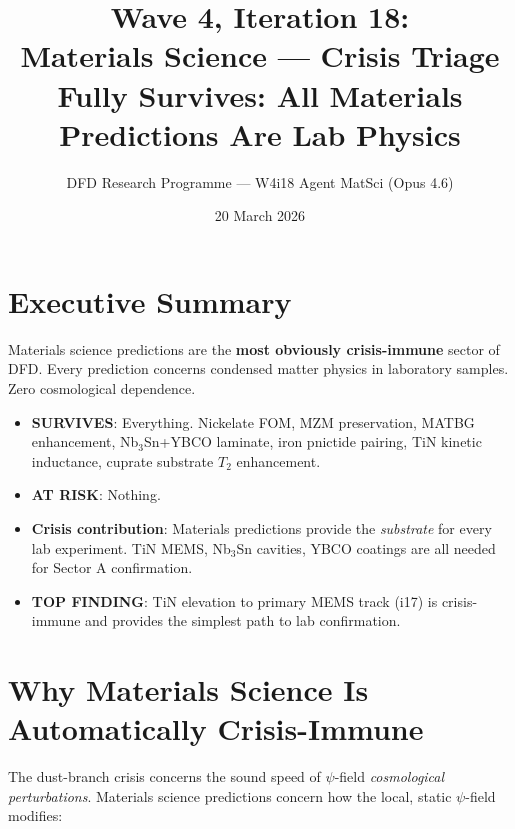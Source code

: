 \documentclass[11pt]{article}
\title{\textbf{Wave 4, Iteration 18:}\\
\textbf{Materials Science --- Crisis Triage}\\[6pt]
{\large Fully Survives: All Materials Predictions Are Lab Physics}}
\author{DFD Research Programme --- W4i18 Agent MatSci (Opus 4.6)}
\date{20 March 2026}
\begin{document}
\maketitle

\section*{Executive Summary}

\begin{tcolorbox}[colback=green!5!white, colframe=green!70!black,
  title=\textbf{W4i18: MATERIALS SCIENCE FULLY SURVIVES}]

Materials science predictions are the \textbf{most obviously crisis-immune}
sector of DFD. Every prediction concerns condensed matter physics in
laboratory samples. Zero cosmological dependence.

\begin{itemize}
\item \textbf{SURVIVES}: Everything. Nickelate FOM, MZM preservation,
  MATBG enhancement, Nb$_3$Sn+YBCO laminate, iron pnictide pairing,
  TiN kinetic inductance, cuprate substrate $T_2$ enhancement.
\item \textbf{AT RISK}: Nothing.
\item \textbf{Crisis contribution}: Materials predictions provide the
  \emph{substrate} for every lab experiment. TiN MEMS, Nb$_3$Sn
  cavities, YBCO coatings are all needed for Sector A confirmation.
\item \textbf{TOP FINDING}: TiN elevation to primary MEMS track (i17)
  is crisis-immune and provides the simplest path to lab confirmation.
\end{itemize}
\end{tcolorbox}

\section{Why Materials Science Is Automatically Crisis-Immune}

The dust-branch crisis concerns the sound speed of $\psi$-field
\emph{cosmological perturbations}. Materials science predictions
concern how the local, static $\psi$-field modifies:
\end{document}
